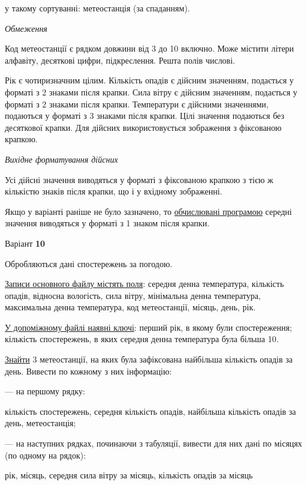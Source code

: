 \documentclass[11pt, ukrainian]{article}
\begin{document}
{\noindent}у такому сортуванні: метеостанція (за спаданням).


\bigskip\textit{Обмеження}

Код метеостанції є рядком довжини від 3 до 10 включно.
Може містити літери алфавіту, десяткові цифри, підкреслення. Решта полів числові.

Рік є чотиризначним цілим.
Кількість опадів є дійсним значенням, подається у форматі з 2 знаками після крапки.
Сила вітру є дійсним значенням, подається у форматі з 2 знаками після крапки.
Температури є дійсними значеннями, подаються у форматі з 3 знаками після крапки.
Цілі значення подаються без десяткової крапки.
Для дійсних використовується зображення з фіксованою крапкою.

\textit{Вихідне форматування дійсних}

Усі дійсні значення виводяться у форматі з фіксованою крапкою з тією ж кількістю знаків після крапки, що і у вхідному зображенні.

Якщо у варіанті раніше не було зазначено, то \underline{обчислювані програмою} середні значення виводяться у форматі з 1 знаком після крапки.


\par
\newpage
{\center Варіант  \No \textbf { 10 }\par}
\bigskip
Обробляються дані спостережень за погодою. 

\underline{Записи основного файлу містять поля}: середня денна температура, кількість опадів, відносна вологість, сила вітру, мінімальна денна температура, максимальна денна температура, код метеостанції, місяць, день, рік.

\underline{У допоміжному файлі наявні ключі}: перший рік, в якому були спостереження; кількість спостережень, в яких середня денна температура була більша 10.

\underline{Знайти} 3 метеостанції, на яких була зафіксована найбільша кількість опадів за день. Вивести по кожному з них інформацію:\par
{\noindent}--- на першому рядку:\par
кількість спостережень, середня кількість опадів, найбільша кількість опадів за день, метеостанція;

{\noindent}--- на наступних рядках, починаючи з табуляції, вивести для них дані по місяцях (по одному на рядок):\par
рік, місяць, середня сила вітру за місяць, кількість опадів за місяць
\end{document}
